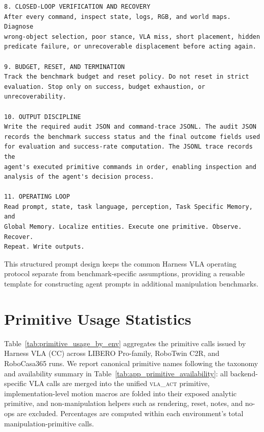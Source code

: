 \documentclass[11pt]{article}
\begin{document}
\begin{samepage}
\begin{lstlisting}[frame=single,framerule=0.5pt]
8. CLOSED-LOOP VERIFICATION AND RECOVERY
After every command, inspect state, logs, RGB, and world maps. Diagnose
wrong-object selection, poor stance, VLA miss, short placement, hidden
predicate failure, or unrecoverable displacement before acting again.

9. BUDGET, RESET, AND TERMINATION
Track the benchmark budget and reset policy. Do not reset in strict
evaluation. Stop only on success, budget exhaustion, or unrecoverability.

10. OUTPUT DISCIPLINE
Write the required audit JSON and command-trace JSONL. The audit JSON
records the benchmark success status and the final outcome fields used
for evaluation and success-rate computation. The JSONL trace records the
agent's executed primitive commands in order, enabling inspection and
analysis of the agent's decision process.

11. OPERATING LOOP
Read prompt, state, task language, perception, Task Specific Memory, and
Global Memory. Localize entities. Execute one primitive. Observe. Recover.
Repeat. Write outputs.
\end{lstlisting}
\end{samepage}

This structured prompt design keeps the common Harness VLA operating protocol separate from benchmark-specific assumptions, providing a reusable template for constructing agent prompts in additional manipulation benchmarks.


\section{Primitive Usage Statistics}
\label{app:primitive_stats}

Table~\ref{tab:primitive_usage_by_env} aggregates the primitive calls issued by Harness VLA (CC) across LIBERO Pro-family, RoboTwin C2R, and RoboCasa365 runs. We report canonical primitive names following the taxonomy and availability summary in Table~\ref{tab:app_primitive_availability}: all backend-specific VLA calls are merged into the unified \textsc{vla\_act} primitive, implementation-level motion macros are folded into their exposed analytic primitive, and non-manipulation helpers such as rendering, reset, notes, and no-ops are excluded. Percentages are computed within each environment's total manipulation-primitive calls.
\end{document}
